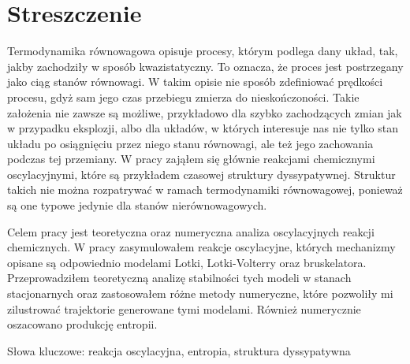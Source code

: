 \documentclass[10pt, a4paper, twoside, onecolumn]{article}
\numberwithin{equation}{section}
\begin{document}
	\section*{Streszczenie}
	Termodynamika równowagowa opisuje procesy, którym podlega dany układ, tak, jakby zachodziły w sposób kwazistatyczny. To oznacza, że proces jest postrzegany jako ciąg stanów równowagi. W takim opisie nie sposób zdefiniować prędkości procesu, gdyż sam jego czas przebiegu zmierza do nieskończoności. Takie założenia nie zawsze są możliwe, przykładowo dla szybko zachodzących zmian jak w przypadku eksplozji, albo dla układów, w których interesuje nas nie tylko stan układu po osiągnięciu przez niego stanu równowagi, ale też jego zachowania podczas tej przemiany. W pracy zająłem się głównie reakcjami chemicznymi oscylacyjnymi, które są przykładem czasowej struktury dyssypatywnej. Struktur takich nie można rozpatrywać w ramach termodynamiki równowagowej, ponieważ są one typowe jedynie dla stanów nierównowagowych. \par
	Celem pracy jest teoretyczna oraz numeryczna analiza oscylacyjnych reakcji chemicznych. W pracy zasymulowałem reakcje oscylacyjne, których mechanizmy opisane są odpowiednio modelami Lotki, Lotki-Volterry oraz bruskelatora. Przeprowadziłem teoretyczną analizę stabilności tych modeli w stanach stacjonarnych oraz zastosowałem różne metody numeryczne, które pozwoliły mi zilustrować trajektorie generowane tymi modelami. Również numerycznie oszacowano produkcję entropii. \par\noindent
	Słowa kluczowe: reakcja oscylacyjna, entropia, struktura dyssypatywna
	
	
\end{document}
